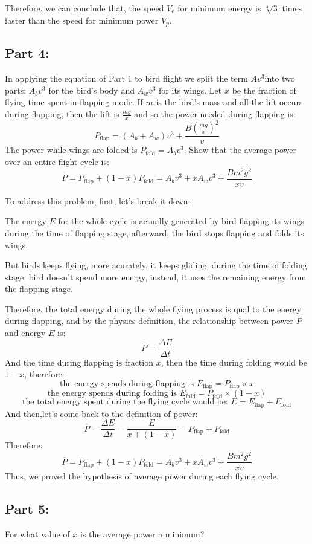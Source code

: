 \documentclass{article}
\begin{document}
Therefore, we can conclude that, the speed \(V_e\) for minimum energy is \(\sqrt[4]{3}\) times faster than the speed for minimum power \(V_p\).

\subsection*{Part 4:}
In applying the equation of Part 1 to bird flight we split the term \(Av^3\)into two
parts: \(A_bv^3\) for the bird’s body and \(A_wv^3\) for its wings. Let \(x\) be the fraction of flying time spent in flapping mode. If \(m\) is the bird’s mass and all the lift occurs during flapping, then the lift is \(\frac{mg}{x}\) and so the power needed during flapping is:
\[P_\text{flap} = (A_b+A_w)v^3+\frac{B(\frac{mg}{x})^2}{v}\]
The power while wings are folded is \(P_\text{fold}=A_bv^3\). Show that the average power over an entire flight cycle is:
\[\overline{P}=P_\text{flap}+(1-x)P_\text{fold} = A_bv^3+xA_wv^3+\frac{Bm^2g^2}{xv}\]

To address this problem, first, let's break it down:

 The energy \(E\) for the whole cycle is actually generated by bird flapping its wings during the time of flapping stage, afterward, the bird stops flapping and folds its wings.

 But birds keeps flying, more acurately, it keeps gliding, during the time of folding stage, bird doesn't spend more energy, instead, it uses the remaining energy from the flapping stage.

Therefore, the total energy during the whole flying process is qual to the energy during flapping, and by the physics definition, the relationship between power \(P\) and energy \(E\) is:
\[\overline{P}=\frac{\Delta E}{\Delta t}\]
And the time during flapping is fraction \(x\), then the time during folding would be \(1-x\), therefore:
\[\text{the energy spends during flapping is } E_\text{flap} =P_\text{flap}\times  x \]
\[\text{the energy spends during folding is } E_\text{fold} = P_\text{fold}\times (1-x)\] 
\[\text{the total energy spent during the flying cycle would be: }E = E_\text{flap} +E_\text{fold} \]
And then,let's come back to the definition of power:
 \[\overline{P}=\frac{\Delta E}{\Delta t}=\frac{E}{x+(1-x)}=P_\text{flap} + P_\text{fold}\]
 Therefore:
\[\overline{P}=P_\text{flap}+(1-x)P_\text{fold} = A_bv^3+xA_wv^3+\frac{Bm^2g^2}{xv}\]
Thus, we proved the hypothesis of average power during each flying cycle.


\subsection*{Part 5:}
For what value of \(x\) is the average power a minimum?
\end{document}
